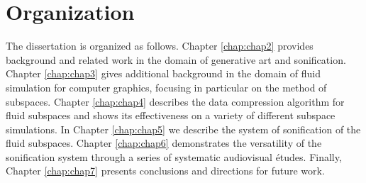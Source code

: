 \section{Organization}
The dissertation is organized as follows. Chapter \ref{chap:chap2} provides background and related work in the domain of generative art and sonification. Chapter \ref{chap:chap3} gives additional background in the domain of fluid simulation for computer graphics, focusing in particular on the method of subspaces. Chapter \ref{chap:chap4} describes the data compression algorithm for fluid subspaces and shows its effectiveness on a variety of different subspace simulations. In Chapter \ref{chap:chap5} we describe the system of sonification of the fluid subspaces. Chapter \ref{chap:chap6} demonstrates the versatility of the sonification system through a series of systematic audiovisual {\'e}tudes. Finally, Chapter \ref{chap:chap7} presents conclusions and directions for future work.
